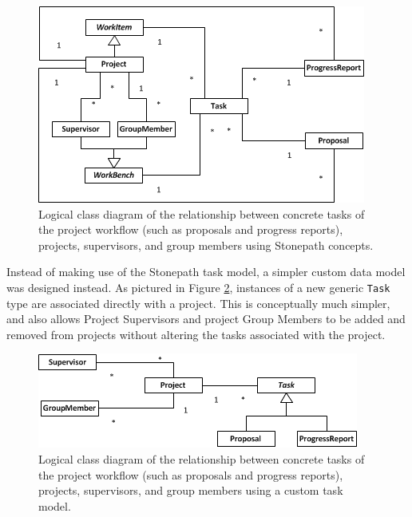 \begin{figure}[!htbp]
\centering \includegraphics{./img/case-study-fourth-year-system/task-with-sptask-static-structure}
\caption{Logical class diagram of the relationship between concrete tasks of the project workflow (such as proposals and progress reports), projects, supervisors, and group members using Stonepath concepts.}
\label{fig:sptask-complexity}
\end{figure}

Instead of making use of the Stonepath task model, a simpler custom data model was designed instead. As pictured in Figure \ref{fig:custom-task-simplicity}, instances of a new generic \verb!Task! type are associated directly with a project. This is conceptually much simpler, and also allows Project Supervisors and project Group Members to be added and removed from projects without altering the tasks associated with the project.

\begin{figure}[!htbp]
\centering \includegraphics{./img/case-study-fourth-year-system/task-through-project-static-structure}
\caption{Logical class diagram of the relationship between concrete tasks of the project workflow (such as proposals and progress reports), projects, supervisors, and group members using a custom task model.}
\label{fig:custom-task-simplicity}
\end{figure}

